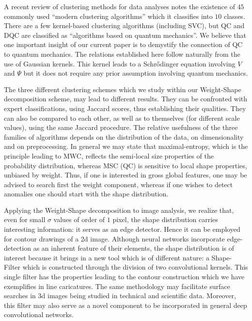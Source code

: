 \documentclass[preprint,12pt]{elsarticle}
\begin{document}
A recent review of clustering methods for data analyses \cite{xu2015comprehensive} notes the existence of $45$ commonly used ``modern clustering algorithms'' which it classifies into $10$ classes. There are a few kernel-based clustering algorithms (including SVC), but QC and DQC are classified as ``algorithms based on quantum mechanics''. We believe that one important insight of our current paper is to demystify the connection of QC to quantum mechanics. The relations established here follow naturally from the use of Gaussian kernels. This kernel leads to a Schrődinger equation involving $V$ and $\Psi$ but it does not require any prior assumption involving quantum mechanics.

The three different clustering schemes which we study within our Weight-Shape decomposition scheme, may lead to different results. They can be confronted with expert classifications, using Jaccard scores, thus establishing their qualities. They can also be compared to each other, as well as to themselves (for different scale values), using the same Jaccard procedure.
The relative usefulness of the three families of algorithms depends on the distribution of the data, on dimensionality and on preprocessing. In general we may state that maximal-entropy, which is the principle leading to MWC, reflects the semi-local size properties of the probability distribution, whereas MSC (QC) is sensitive to local shape properties, unbiased by weight. Thus, if one is interested in gross global features, one may be advised to search first the weight component, whereas if one wishes to detect anomalies one should start with the shape distribution.

Applying the Weight-Shape decomposition to image analysis, we realize that, even for small $\sigma$ values of order of $1$ pixel, the shape distribution carries interesting information: it serves as an edge detector. Hence it can be employed for contour drawings of a 2d image. Although neural networks incorporate edge-detection as an inherent feature of their elements, the shape distribution is of interest because it brings in a new tool which is of different nature: a Shape-Filter which is constructed through the division of two convolutional kernels. This single filter has the properties leading to the contour construction which we have exemplifies in line caricatures. The same methodology may facilitate surface searches in 3d images being studied in technical and scientific data. Moreover, this filter may also serve as a novel component to be incorporated in general deep convolutional networks.
\end{document}
